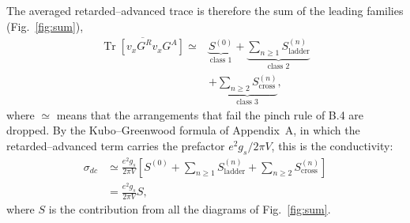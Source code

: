 The averaged retarded--advanced trace is therefore the sum of
the leading families (Fig.~\ref{fig:sum}),
\[
\begin{aligned}
\overline{\operatorname{Tr}[v_xG^Rv_xG^A]}
\simeq{}&
\underbrace{S^{(0)}}_{\text{class 1}}
+\underbrace{\sum_{n\ge1}S^{(n)}_{\mathrm{ladder}}}
_{\text{class 2}}\\
&+
\underbrace{\sum_{n\ge2}S^{(n)}_{\mathrm{cross}}}
_{\text{class 3}},
\end{aligned}
\]
where $\simeq$ means that the arrangements that fail the pinch
rule of B.4 are dropped. By the Kubo--Greenwood formula of
Appendix~A, in which the retarded--advanced term carries the
prefactor $e^2g_s/2\pi V$, this is the conductivity:
\begin{equation}
\begin{aligned}
\sigma_{dc}
&\simeq
\frac{e^2g_s}{2\pi V}
\left[
S^{(0)}
+\sum_{n\ge1}S^{(n)}_{\mathrm{ladder}}
+\sum_{n\ge2}S^{(n)}_{\mathrm{cross}}
\right]\\
&=\frac{e^2g_s}{2\pi V}S,
\end{aligned}
\label{eq:sigma}
\end{equation}
where $S$ is the contribution from all the diagrams of Fig.~\ref{fig:sum}.

